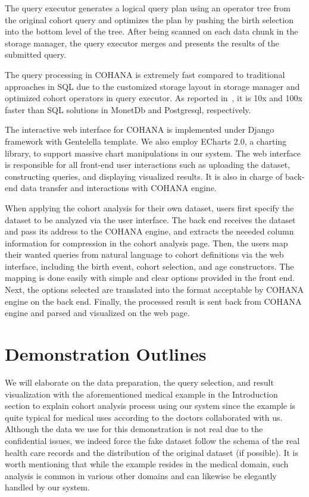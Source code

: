 \documentclass[10pt,conference,letterpaper]{IEEEtran}
\begin{document}
The query executor generates a logical query plan using an operator tree from the original cohort query and optimizes the plan by pushing the birth selection into the bottom level of the tree. After being scanned on each data chunk in the storage manager, the query executor merges and presents the results of the submitted query.

The query processing in COHANA is extremely fast compared to traditional approaches in SQL due to the customized storage layout in storage manager and optimized cohort operators in query executor. As reported in~\cite{jiang2016cohort}, it is 10x and 100x faster than SQL solutions in MonetDb\cite{boncz2005monetdb} and Postgresql\cite{momjian2001postgresql}, respectively.

The interactive web interface for COHANA is implemented under Django\cite{django} framework with Gentelella\cite{gentelella} template. We also employ ECharts 2.0\cite{echarts}, a charting library, to support massive chart manipulations in our system. 
The web interface is responsible for all front-end user interactions such as uploading the dataset, constructing queries, and displaying visualized results. 
It is also in charge of back-end data transfer and interactions with COHANA engine. 

When applying the cohort analysis for their own dataset, users first specify the dataset to be analyzed via the user interface.
The back end receives the dataset and pass its address to the COHANA engine, and extracts the neeeded column information for compression in the cohort analysis page. 
Then, the users map their wanted queries from natural language to cohort definitions via the web interface, including the birth event, cohort selection, and age constructors.
The mapping is done easily with simple and clear options provided in the front end.
Next, the options selected are translated into the format acceptable by COHANA engine on the back end. Finally, the processed result is sent back from COHANA engine and parsed and visualized on the web page.

\section{Demonstration Outlines}

We will elaborate on the data preparation, the query selection, and result visualization with the aforementioned medical example in the Introduction section to explain cohort analysis process using our system since the example is quite typical for medical uses according to the doctors collaborated with us.
Although the data we use for this demonstration is not real due to the confidential issues, we indeed force the fake dataset follow the schema of the real health care records and the distribution of the original dataset (if possible).
It is worth mentioning that while the example resides in the medical domain, such analysis is common in various other domains and can likewise be elegantly handled by our system.
\end{document}
